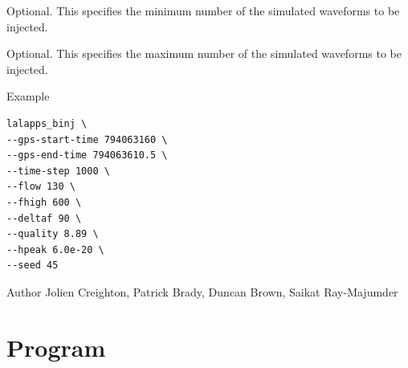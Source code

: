 \begin{entry}
\begin{entry}
\item[\option{--simwaveform-min-number} \parm{simwaveform-min-number}] 
Optional.  This specifies the minimum number of the simulated waveforms to be injected.

\item[\option{--simwaveform-max-number} \parm{simwaveform-max-number}] 
Optional.  This specifies the maximum number of the simulated waveforms to be injected.  
\end{entry}

\item[Example]
\begin{verbatim}
lalapps_binj \
--gps-start-time 794063160 \
--gps-end-time 794063610.5 \
--time-step 1000 \
--flow 130 \
--fhigh 600 \
--deltaf 90 \
--quality 8.89 \
--hpeak 6.0e-20 \
--seed 45
\end{verbatim}

\item[Author] 
Jolien Creighton, Patrick Brady, Duncan Brown, Saikat Ray-Majumder
\end{entry}
\clearpage


\section{Program }
\label{program:lalapps-binj-find}

